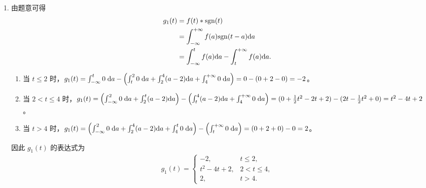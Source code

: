 \begin{solution}
    \begin{enumerate}[label=(\arabic*)]
        \item 由题意可得
            \begin{align*}
                g_1(t) & = f(t) * \mathrm{sgn}(t) \\
                & = \int_{-\infty}^{+\infty}f(a)\mathrm{sgn}(t - a)\mathrm{d}a \\
                & = \int_{-\infty}^{t}f(a)\mathrm{d}a - \int_{t}^{+\infty}f(a)\mathrm{d}a.
            \end{align*}

            \begin{enumerate}
                \item 当 $t \le 2$ 时，$g_1(t)
                    = \int_{-\infty}^{t}0\;\mathrm{d}a - \left(\int_{t}^{2}0\;\mathrm{d}a + \int_{2}^{4}(a - 2)\mathrm{d}a + \int_{4}^{+\infty}0\;\mathrm{d}a\right)
                    = 0 - (0 + 2 - 0) = -2$。
                \item 当 $2 < t \le 4$ 时，$g_1(t)
                    = \left(\int_{-\infty}^{2}0\;\mathrm{d}a + \int_{2}^{t}(a - 2)\mathrm{d}a\right) - \left(\int_{t}^{4}(a - 2)\mathrm{d}a + \int_{4}^{+\infty}0\;\mathrm{d}a\right)
                    = (0 + \frac{1}{2}t^2 - 2t + 2) - (2t - \frac{1}{2}t^2 + 0)
                    = t^2 - 4t + 2$。
                \item 当 $t > 4$ 时，$g_1(t)
                    = \left(\int_{-\infty}^{2}0\;\mathrm{d}a + \int_{2}^{4}(a - 2)\mathrm{d}a + \int_{4}^{t}0\;\mathrm{d}a\right) - \left(\int_{t}^{+\infty}0\;\mathrm{d}a\right)
                    = (0 + 2 + 0) - 0
                    = 2$。
            \end{enumerate}

            因此 $g_1(t)$ 的表达式为
            \begin{align*}
                g_1(t) = \begin{cases}
                    -2, & t \le 2, \\
                    t^2 - 4t + 2, & 2 < t \le 4, \\
                    2, & t > 4.
                \end{cases}
            \end{align*}


\end{enumerate}
\end{solution}
